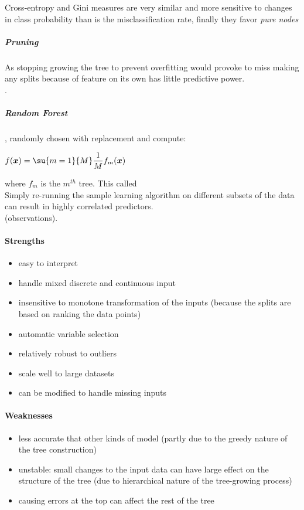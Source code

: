 Cross-entropy and Gini measures are very similar and more sensitive to changes in class
probability than is the misclassification rate, finally they favor \emph{pure nodes}
\subparagraph{Pruning}
As stopping growing the tree to prevent overfitting would provoke to miss making any
splits because of feature on its own has little predictive power.\\
.
\subparagraph{Random Forest}
, randomly chosen with replacement and compute:
\begin{center}
    $f(\bm{x}) = \su{m=1}{M}\dfrac{1}{M}f_{m}(\bm{x})$
\end{center}
where $f_{m}$ is the $m^{th}$ tree. This called \\
Simply re-running the sample learning algorithm on different subsets of the data can
result in highly correlated predictors.\\
 (observations). 




 


\paragraph{Strengths}
\begin{itemize}
    \item easy to interpret
    \item handle mixed discrete and continuous input
    \item insensitive to monotone transformation of the inputs (because the splits
        are based on ranking the data points)
    \item automatic variable selection 
    \item relatively robust to outliers
    \item scale well to large datasets
    \item can be modified to handle missing inputs
\end{itemize}


\paragraph{Weaknesses}
\begin{itemize}
    \item less accurate that other kinds of model (partly due to the greedy nature of
        the tree construction)
    \item unstable: small changes to the input data can have large effect on the 
        structure of the tree (due to hierarchical nature of the tree-growing process)
    \item causing errors at the top can affect the rest of the tree
\end{itemize}

